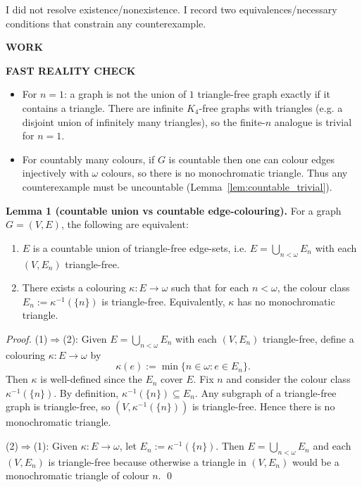 I did not resolve existence/nonexistence. I record two equivalences/necessary conditions that constrain any counterexample.

\bigskip
\noindent\textbf{WORK}

\medskip
\noindent\textbf{FAST REALITY CHECK}

\begin{itemize}
\item For $n=1$: a graph is not the union of $1$ triangle-free graph exactly if it contains a triangle. There are infinite $K_4$-free graphs with triangles (e.g. a disjoint union of infinitely many triangles), so the finite-$n$ analogue is trivial for $n=1$.
\item For countably many colours, if $G$ is countable then one can colour edges injectively with $\omega$ colours, so there is no monochromatic triangle. Thus any counterexample must be uncountable (Lemma~\ref{lem:countable_trivial}).
\end{itemize}

\medskip
\noindent\textbf{Lemma 1 (countable union vs countable edge-colouring).}\label{lem:countable_union_colouring}
For a graph $G=(V,E)$, the following are equivalent:
\begin{enumerate}
\item $E$ is a countable union of triangle-free edge-sets, i.e. $E=\bigcup_{n<\omega} E_n$ with each $(V,E_n)$ triangle-free.
\item There exists a colouring $\kappa:E\to\omega$ such that for each $n<\omega$, the colour class $E_n:=\kappa^{-1}(\{n\})$ is triangle-free.
Equivalently, $\kappa$ has no monochromatic triangle.
\end{enumerate}

\emph{Proof.}
(1)$\Rightarrow$(2):
Given $E=\bigcup_{n<\omega} E_n$ with each $(V,E_n)$ triangle-free, define a colouring $\kappa:E\to\omega$ by
\[
\kappa(e):=\min\{n\in\omega: e\in E_n\}.
\]
Then $\kappa$ is well-defined since the $E_n$ cover $E$.
Fix $n$ and consider the colour class $\kappa^{-1}(\{n\})$.
By definition, $\kappa^{-1}(\{n\})\subseteq E_n$.
Any subgraph of a triangle-free graph is triangle-free, so $(V,\kappa^{-1}(\{n\}))$ is triangle-free.
Hence there is no monochromatic triangle.

(2)$\Rightarrow$(1):
Given $\kappa:E\to\omega$, let $E_n:=\kappa^{-1}(\{n\})$.
Then $E=\bigcup_{n<\omega}E_n$ and each $(V,E_n)$ is triangle-free because otherwise a triangle in $(V,E_n)$ would be a monochromatic triangle of colour $n$.
\qed

